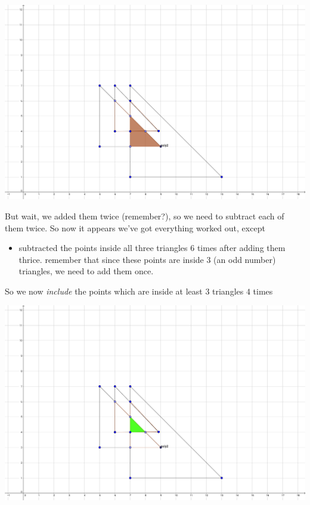 \begin{center}
            \includegraphics[scale=0.1]{images/color5.png}
        \end{center}

        But wait, we added them twice (remember?), so we need to subtract each of them twice.
        So now it appears we've got everything worked out, except

        \begin{itemize}
            \item subtracted the points inside all three triangles 6 times after adding them thrice.
            remember that since these points are inside 3 (an odd number) triangles, we need to add them
            once.
        \end{itemize}

        So we now \emph{include} the points which are inside at least $3$ triangles $4$ times

        \begin{center}
            \includegraphics[scale=0.2]{images/color7.png}
        \end{center}

